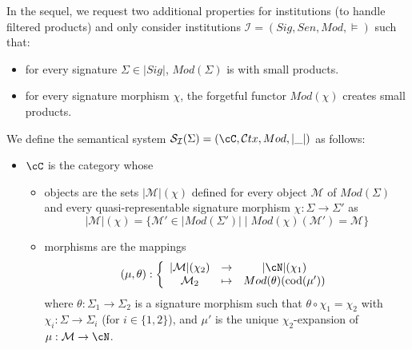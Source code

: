 \documentclass[preprint,3p,times]{elsarticle}
\newcommand{\codom}{\mathrm{cod}}
\newcommand{\Ctx}{\mathcal{C}tx}
\begin{document}
In the sequel, we request two additional properties for institutions (to handle filtered products) and only consider institutions $\mathcal{I} = (Sig,Sen,Mod,\models)$ such that:
\begin{itemize}
    \item for every signature $\Sigma \in |Sig|$, $Mod(\Sigma)$ is with small products.
    \item for every signature morphism $\chi$, the forgetful functor $Mod(\chi)$ creates small products.
\end{itemize}
We define the semantical system $\mathcal{S}_\mathcal{I}(\Sigma) = (\cC,\Ctx,Mod,|\_|)$ as follows:
\begin{itemize}
    \item $\cC$ is the category whose 
    \begin{itemize}
        \item objects are the sets \(|\mathcal{M}|(\chi)\) defined for every object $\mathcal{M}$ of \(Mod(\Sigma)\) and every quasi-representable signature morphism $\chi : \Sigma \to \Sigma'$ as
        \[
            |\mathcal{M}|(\chi) = \{\mathcal{M}' \in |Mod(\Sigma')| \mid Mod(\chi)(\mathcal{M}') = \mathcal{M}\}
        \] 
        \item morphisms are the mappings 
        \[(\mu,\theta) : 
        \left\{
        \begin{array}{ccc}
        |\mathcal{M}|(\chi_2) & \to & |\cN|(\chi_1) \\
        \mathcal{M}_2 & \mapsto & Mod(\theta)(\codom(\mu')) 
        \end{array}
        \right.\]
        where $\theta : \Sigma_1 \to \Sigma_2$ is a signature morphism such that $\theta \circ \chi_1 = \chi_2$ with $\chi_i :\Sigma \to \Sigma_i$ (for $i \in \{1,2\}$), and $\mu'$ is the unique $\chi_2$-expansion of $\mu : \mathcal{M} \to \cN$.
    \end{itemize}


\end{itemize}
\end{document}
